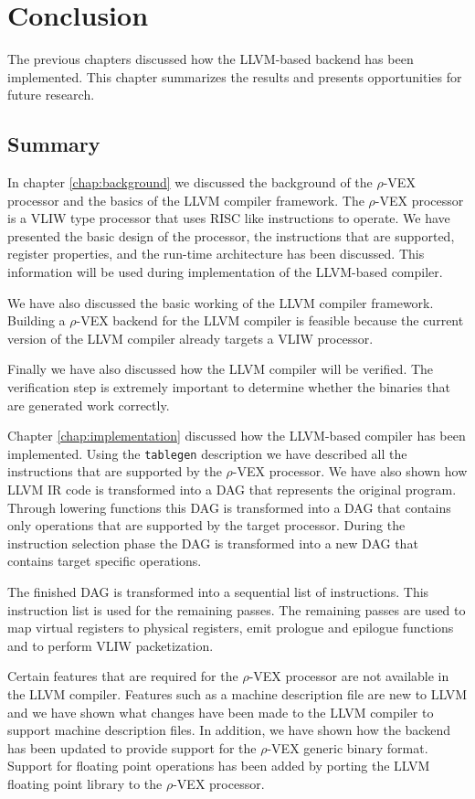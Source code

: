\chapter{Conclusion}
\label{chap:conclusion}
The previous chapters discussed how the LLVM-based backend has been implemented. This chapter summarizes the results and presents opportunities for future research.

\section{Summary}
In chapter \ref{chap:background} we discussed the background of the $\rho$-VEX processor and the basics of the LLVM compiler framework. The $\rho$-VEX processor is a VLIW type processor that uses RISC like instructions to operate. We have presented the basic design of the processor, the instructions that are supported, register properties, and the run-time architecture has been discussed. This information will be used during implementation of the LLVM-based compiler.

We have also discussed the basic working of the LLVM compiler framework. Building a $\rho$-VEX backend for the LLVM compiler is feasible because the current version of the LLVM compiler already targets a VLIW processor. 

Finally we have also discussed how the LLVM compiler will be verified. The verification step is extremely important to determine whether the binaries that are generated work correctly.

Chapter \ref{chap:implementation} discussed how the LLVM-based compiler has been implemented. Using the \texttt{tablegen} description we have described all the instructions that are supported by the $\rho$-VEX processor. We have also shown how LLVM IR code is transformed into a DAG that represents the original program. Through lowering functions this DAG is transformed into a DAG that contains only operations that are supported by the target processor. During the instruction selection phase the DAG is transformed into a new DAG that contains target specific operations.

The finished DAG is transformed into a sequential list of instructions. This instruction list is used for the remaining passes. The remaining passes are used to map virtual registers to physical registers, emit prologue and epilogue functions and to perform VLIW packetization.

Certain features that are required for the $\rho$-VEX processor are not available in the LLVM compiler. Features such as a machine description file are new to LLVM and we have shown what changes have been made to the LLVM compiler to support machine description files. In addition, we have shown how the backend has been updated to provide support for the $\rho$-VEX generic binary format. Support for floating point operations has been added by porting the LLVM floating point library to the $\rho$-VEX processor.

